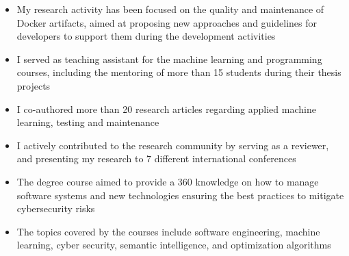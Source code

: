    \begin{itemize}
         \item My research activity has been focused on the quality and maintenance of Docker artifacts, aimed at proposing new approaches and guidelines for developers to support them during the development activities
         \item I served as teaching assistant for the machine learning and programming courses, including the mentoring of more than 15 students during their thesis projects
         \item I co-authored more than 20 research articles regarding applied machine learning, testing and maintenance
         \item I actively contributed to the research community by serving as a reviewer, and presenting my research to 7 different international conferences
      \end{itemize}

   \medskip

   \begin{itemize}
         \item The degree course aimed to provide a 360 knowledge on how to manage software systems and new technologies ensuring the best practices to mitigate cybersecurity risks
         \item The topics covered by the courses include software engineering, machine learning, cyber security, semantic intelligence, and optimization algorithms 
      \end{itemize}